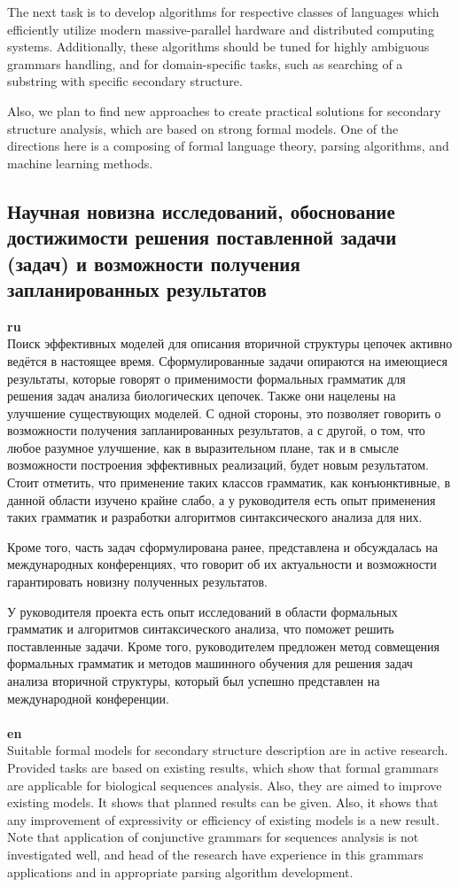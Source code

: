 \documentclass[12pt]{article}  %
\theoremstyle{remark}
\begin{document}
The next task is to develop algorithms for respective classes of languages which efficiently utilize modern massive-parallel hardware and distributed computing systems.
Additionally, these algorithms should be tuned for highly ambiguous grammars handling, and for domain-specific tasks, such as searching of a substring with specific secondary structure.

Also, we plan to find new approaches to create practical solutions for secondary structure analysis, which are based on strong formal models.
One of the directions here is a composing of formal language theory, parsing algorithms, and machine learning methods.

\subsection{Научная новизна исследований, обоснование достижимости решения поставленной задачи (задач) и возможности получения запланированных результатов}

\textbf{ru}\\
Поиск эффективных моделей для описания вторичной структуры цепочек активно ведётся в настоящее время.
Сформулированные задачи опираются на имеющиеся результаты, которые говорят о применимости формальных грамматик для решения задач анализа биологических цепочек. Также они нацелены на улучшение существующих моделей.
С одной стороны, это позволяет говорить о возможности получения запланированных результатов, а с другой, о том, что любое разумное улучшение, как в выразительном плане, так и в смысле возможности построения эффективных реализаций, будет новым результатом.
Стоит отметить, что применение таких классов грамматик, как конъюнктивные, в данной области изучено крайне слабо, а у руководителя есть опыт применения таких грамматик и разработки алгоритмов синтаксического анализа для них.

Кроме того, часть задач сформулирована ранее, представлена и обсуждалась на международных конференциях, что говорит об их актуальности и возможности гарантировать новизну полученных результатов.

У руководителя проекта есть опыт исследований в области формальных грамматик и алгоритмов синтаксического анализа, что поможет решить поставленные задачи.
Кроме того, руководителем предложен метод совмещения формальных грамматик и методов машинного обучения для решения задач анализа вторичной структуры, который был успешно представлен на международной конференции.
\\
\\
\textbf{en}\\
Suitable formal models for secondary structure description are in active research.
Provided tasks are based on existing results, which show that formal grammars are applicable for biological sequences analysis.
Also, they are aimed to improve existing models.
It shows that planned results can be given. Also, it shows that any improvement of expressivity or efficiency of existing models is a new result.
Note that application of conjunctive grammars for sequences analysis is not investigated well, and head of the research have experience in this grammars applications and in appropriate parsing algorithm development.
\end{document}
